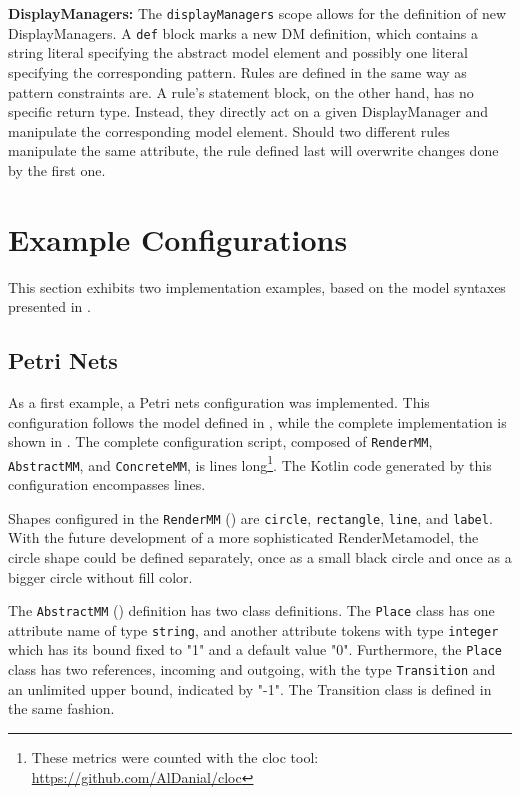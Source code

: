 \textbf{DisplayManagers:} The \texttt{displayManagers} scope allows for the definition of new DisplayManagers. A \texttt{def} block marks a new DM definition, which contains a string literal specifying the abstract model element and possibly one literal specifying the corresponding pattern. 
Rules are defined in the same way as pattern constraints are. A rule's statement block, on the other hand, has no specific return type. Instead, they directly act on a given DisplayManager and manipulate the corresponding model element. Should two different rules manipulate the same attribute, the rule defined last will overwrite changes done by the first one.

\section{Example Configurations}
\label{sec:example-configs}
This section exhibits two implementation examples, based on the model syntaxes presented in .

\subsection{Petri Nets}
\label{sec:petri-impl}
As a first example, a Petri nets configuration was implemented. This configuration follows the model defined in , while the complete implementation is shown in . The complete configuration script, composed of \texttt{RenderMM}, \texttt{AbstractMM}, and \texttt{ConcreteMM}, is \petriConfigLoC lines long\footnote{These metrics were counted with the cloc tool: \url{https://github.com/AlDanial/cloc}}. The Kotlin code generated by this configuration encompasses \petriGeneratedLoC lines. 

Shapes configured in the \texttt{RenderMM} () are \texttt{circle}, \texttt{rectangle}, \texttt{line}, and \texttt{label}. With the future development of a more sophisticated RenderMetamodel, the circle shape could be defined separately, once as a small black circle and once as a bigger circle without fill color. 

The \texttt{AbstractMM} () definition has two class definitions. The \texttt{Place} class has one attribute name of type \texttt{string}, and another attribute tokens with type \texttt{integer} which has its bound fixed to "1" and a default value "0". Furthermore, the \texttt{Place} class has two references, incoming and outgoing, with the type \texttt{Transition} and an unlimited upper bound, indicated by "-1". The Transition class is defined in the same fashion.

